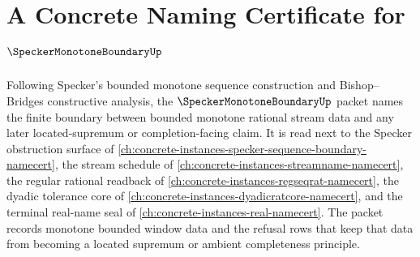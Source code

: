 \chapter{A Concrete Naming Certificate for $\SpeckerMonotoneBoundaryUp$}
\label{ch:concrete-instances-specker-monotone-boundary-namecert}

Following Specker's bounded monotone sequence construction and Bishop--Bridges constructive analysis, the $\SpeckerMonotoneBoundaryUp$ packet names the finite boundary between bounded monotone rational stream data and any later located-supremum or completion-facing claim. It is read next to the Specker obstruction surface of \autoref{ch:concrete-instances-specker-sequence-boundary-namecert}, the stream schedule of \autoref{ch:concrete-instances-streamname-namecert}, the regular rational readback of \autoref{ch:concrete-instances-regseqrat-namecert}, the dyadic tolerance core of \autoref{ch:concrete-instances-dyadicratcore-namecert}, and the terminal real-name seal of \autoref{ch:concrete-instances-real-namecert}. The packet records monotone bounded window data and the refusal rows that keep that data from becoming a located supremum or ambient completeness principle.

